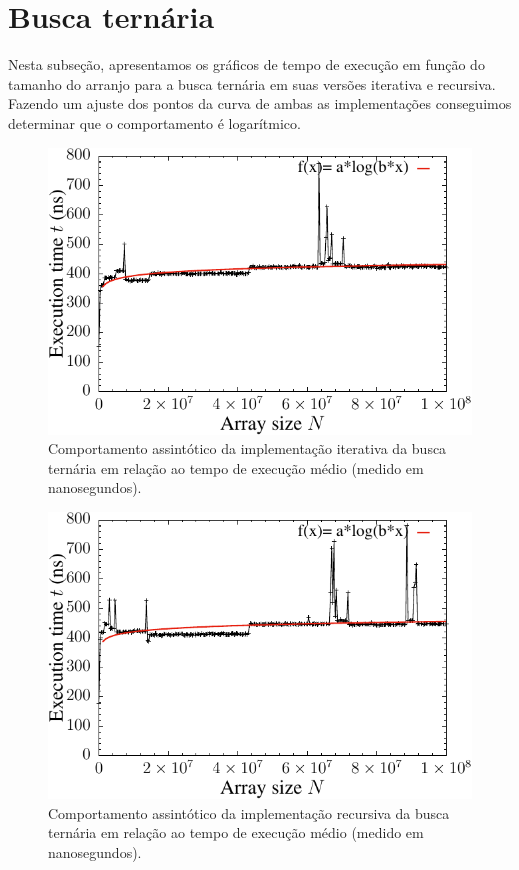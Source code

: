 \section{Busca ternária}

Nesta subseção, apresentamos os gráficos de tempo de execução em função do tamanho do arranjo para a busca ternária em suas versões iterativa e recursiva. Fazendo um ajuste dos pontos da curva de ambas as implementações conseguimos determinar que o comportamento é logarítmico.
\begin{figure}[H]
  \centering
  \includegraphics[scale=1.2]{../plots/tsearch_it_time.pdf}
  \caption{Comportamento assintótico da implementação iterativa da busca ternária em relação ao tempo de execução médio (medido em nanosegundos).}
  \label{fig:tseach_it_time}
\end{figure} 

\begin{figure}[H]
  \centering
  \includegraphics[scale=1.2]{../plots/tsearch_rec_time.pdf}
  \caption{Comportamento assintótico da implementação recursiva da busca ternária em relação ao tempo de execução médio (medido em nanosegundos).}
 \label{fig:tseach_rec_time}
\end{figure}

